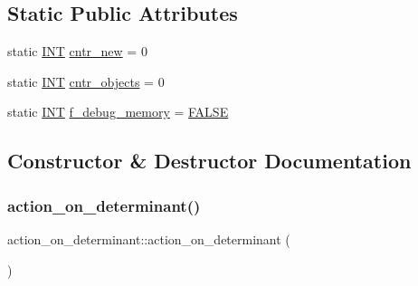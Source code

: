 \subsection*{Static Public Attributes}
\begin{DoxyCompactItemize}
\item 
static \mbox{\hyperlink{galois_8h_a09fddde158a3a20bd2dcadb609de11dc}{I\+NT}} \mbox{\hyperlink{classaction__on__determinant_a1ad8438a756f7c4f468b294e4f16c59b}{cntr\+\_\+new}} = 0
\item 
static \mbox{\hyperlink{galois_8h_a09fddde158a3a20bd2dcadb609de11dc}{I\+NT}} \mbox{\hyperlink{classaction__on__determinant_a2b76d0a1f29fcb2c388b1902337dba70}{cntr\+\_\+objects}} = 0
\item 
static \mbox{\hyperlink{galois_8h_a09fddde158a3a20bd2dcadb609de11dc}{I\+NT}} \mbox{\hyperlink{classaction__on__determinant_a854af28edd8b5ffa4425b005b09d9f92}{f\+\_\+debug\+\_\+memory}} = \mbox{\hyperlink{nauty_8h_aa93f0eb578d23995850d61f7d61c55c1}{F\+A\+L\+SE}}
\end{DoxyCompactItemize}


\subsection{Constructor \& Destructor Documentation}
\mbox{\label{classaction__on__determinant_a76a6fbf2de8fe0b5f58803fd0559fe46}} 
\subsubsection{\texorpdfstring{action\+\_\+on\+\_\+determinant()}{action\_on\_determinant()}}
{\footnotesize\ttfamily action\+\_\+on\+\_\+determinant\+::action\+\_\+on\+\_\+determinant (\begin{DoxyParamCaption}{ }\end{DoxyParamCaption})}

\mbox{\label{classaction__on__determinant_a60ea190130efecae323612307c9680aa}} 
